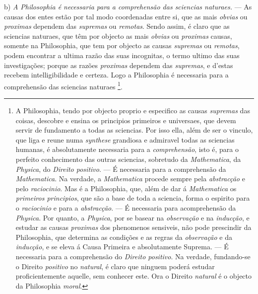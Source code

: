 b) \emph{A Philosophia é necessaria para a comprehensão das sciencias naturaes.} --- As causas dos entes estão por tal modo coordenadas entre si, que as mais \emph{obvias} ou \emph{proximas} dependem das \emph{supremas} ou \emph{remotas}. Sendo assim, é claro que as sciencias naturaes, que têm por objecto as mais \emph{obvias} ou \emph{proximas} causas, somente na Philosophia, que tem por objecto as causas \emph{supremas} ou \emph{remotas}, podem encontrar a ultima razão das suas incognitas, o termo ultimo das suas investigações; porque as razões \emph{proximas} dependem das \emph{supremas}, e d'estas recebem intelligibilidade e certeza. Logo a Philosophia é necessaria para a comprehensão das sciencias naturaes \footnote{A Philosophia, tendo por objecto proprio e especifico as causas \emph{supremas} das coisas, descobre e ensina os principios primeiros e universaes, que devem servir de fundamento a todas as sciencias. Por isso ella, além de ser o vinculo, que liga e reune numa \emph{synthese} grandiosa e admiravel todas as sciencias humanas, é absolutamente necessaria para a \emph{comprehensão}, isto é, para o perfeito conhecimento das outras sciencias, sobretudo da \emph{Mathematica}, da \emph{Physica}, do \emph{Direito positivo}. --- É necessaria para a comprehensão da \emph{Mathematica}. Na verdade, a \emph{Mathematica} procede sempre pela \emph{abstracção} e pelo \emph{raciocinio}. Mas é a Philosophia, que, além de dar á \emph{Mathematica} os \emph{primeiros principios}, que são a base de toda a sciencia, forma o espirito para o \emph{raciocinio} e para a \emph{abstracção}. --- É necessaria para acomprehensão da \emph{Physica}. Por quanto, a \emph{Physica}, por se basear na \emph{observação} e na \emph{inducção}, e estudar as causas \emph{proximas} dos phenomenos sensiveis, não pode prescindir da Philosophia, que determina as condições e as regras da \emph{observação} e da \emph{inducção}, e se eleva á Causa Primeira e absolutamente Suprema. --- É necessaria para a comprehensão do \emph{Direito positivo}. Na verdade, fundando-se o Direito \emph{positivo} no \emph{natural}, é claro que ninguem poderá estudar proficientemente aquelle, sem conhecer este. Ora o Direito \emph{natural} é o objecto da Philosophia \emph{moral}.}.


 


